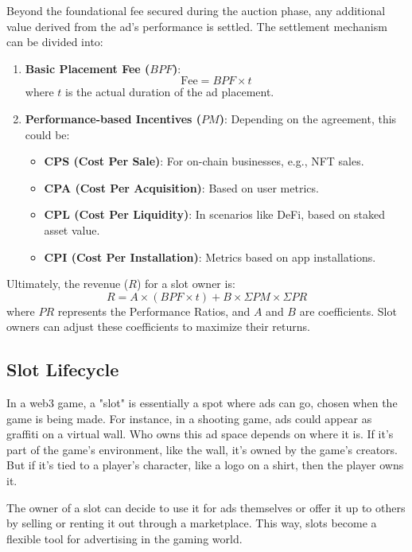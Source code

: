 Beyond the foundational fee secured during the auction phase, any additional value derived from the ad's performance is settled. The settlement mechanism can be divided into:

\begin{enumerate}
    \item \textbf{Basic Placement Fee (\( BPF \))}: 
    \begin{equation}
    \text{Fee} = BPF \times t
    \end{equation}
    where \( t \) is the actual duration of the ad placement.

    \item \textbf{Performance-based Incentives (\( PM \))}: Depending on the agreement, this could be:
    \begin{itemize}
        \item \textbf{CPS (Cost Per Sale)}: For on-chain businesses, e.g., NFT sales.
        \item \textbf{CPA (Cost Per Acquisition)}: Based on user metrics.
        \item \textbf{CPL (Cost Per Liquidity)}: In scenarios like DeFi, based on staked asset value.
        \item \textbf{CPI (Cost Per Installation)}: Metrics based on app installations.
    \end{itemize}
\end{enumerate}

Ultimately, the revenue (\( R \)) for a slot owner is:
\begin{equation}
R = A \times (BPF \times t) + B \times \Sigma PM \times \Sigma PR
\end{equation}
where \( PR \) represents the Performance Ratios, and \( A \) and \( B \) are coefficients. Slot owners can adjust these coefficients to maximize their returns.


\subsection{Slot Lifecycle}


In a web3 game, a "slot" is essentially a spot where ads can go, chosen when the game is being made. For instance, in a shooting game, ads could appear as graffiti on a virtual wall. Who owns this ad space depends on where it is. If it's part of the game's environment, like the wall, it's owned by the game's creators. But if it's tied to a player's character, like a logo on a shirt, then the player owns it.

The owner of a slot can decide to use it for ads themselves or offer it up to others by selling or renting it out through a marketplace. This way, slots become a flexible tool for advertising in the gaming world.
